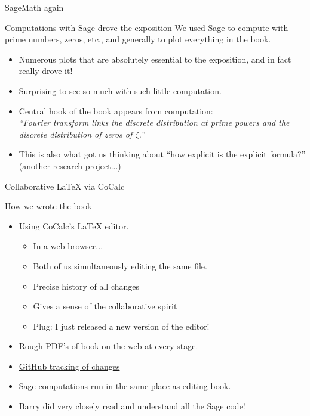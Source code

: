 \documentclass{beamer}
\begin{document}
\begin{frame}{SageMath again}
  \begin{block}{Computations with Sage drove the exposition}
    We used Sage to compute with prime numbers, zeros, etc., and generally to plot everything in the book.
    \begin{itemize}
      \item Numerous plots that are absolutely essential to the exposition, and in fact really drove it!
      \item Surprising to see so much with such little computation.
      \item Central hook of the book appears from computation:\\
            {\em ``Fourier transform links the discrete distribution at prime powers and the discrete distribution of zeros of $\zeta$.''}
      \item This is also what got us thinking about ``how explicit is the explicit formula?'' (another research project...)
    \end{itemize}
  \end{block}
\end{frame}


\begin{frame}{Collaborative \LaTeX{} via CoCalc}
  \begin{block}{How we wrote the book}
    \begin{itemize}
      \item Using CoCalc's \LaTeX{} editor.
            \begin{itemize}
              \item In a web browser...
              \item Both of us simultaneously editing the same file.
              \item Precise history of all changes
              \item Gives a sense of the collaborative spirit
              \item Plug: I just released a new version of the editor!
            \end{itemize}
      \item Rough PDF's of book on the web at every stage.
      \item \href{https://github.com/williamstein/rh}{GitHub tracking of changes}
      \item Sage computations run in the same place as editing book.
      \item Barry did very closely read and understand all the Sage code!
    \end{itemize}
  \end{block}
\end{frame}
\end{document}
